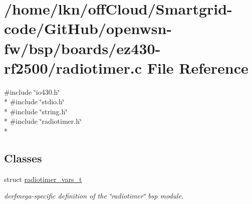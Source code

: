 \hypertarget{ez430-rf2500_2radiotimer_8c}{}\section{/home/lkn/off\+Cloud/\+Smartgrid-\/code/\+Git\+Hub/openwsn-\/fw/bsp/boards/ez430-\/rf2500/radiotimer.c File Reference}
\label{ez430-rf2500_2radiotimer_8c}
{\ttfamily \#include \char`\"{}io430.\+h\char`\"{}}\\*
{\ttfamily \#include \char`\"{}stdio.\+h\char`\"{}}\\*
{\ttfamily \#include \char`\"{}string.\+h\char`\"{}}\\*
{\ttfamily \#include \char`\"{}radiotimer.\+h\char`\"{}}\\*
\subsection*{Classes}
\begin{DoxyCompactItemize}
\item 
struct \hyperlink{structradiotimer__vars__t}{radiotimer\+\_\+vars\+\_\+t}
\begin{DoxyCompactList}\small\item\em derfmega-\/specific definition of the \char`\"{}radiotimer\char`\"{} bsp module. \end{DoxyCompactList}\end{DoxyCompactItemize}
